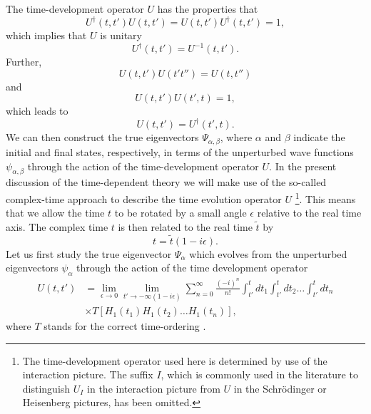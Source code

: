 The time-development operator $U$ has the
properties that
\begin{equation}
     U^{\dagger}(t,t')U(t,t')=U(t,t')U^{\dagger}(t,t')=1,
\end{equation}
which implies that $U$ is unitary
\begin{equation}
     U^{\dagger}(t,t')=U^{-1}(t,t').
\end{equation}
Further,
\begin{equation}
    U(t,t')U(t't'')=U(t,t'')
\end{equation}
and
\begin{equation}
    U(t,t')U(t',t)=1,
\end{equation}
which leads to
\begin{equation}
    U(t,t')=U^{\dagger}(t',t).
\end{equation}
We can then construct the true eigenvectors $\Psi_{\alpha ,\beta}$, 
where $\alpha$ and
$\beta$ indicate the initial and final states, respectively, in
terms of the unperturbed wave functions $\psi_{\alpha,\beta}$  
through the
action of the time-development operator $U$.
In the present discussion of the time-dependent theory we will make
use of the so-called complex-time approach to describe the time
evolution operator $U$ \cite{ko90}\footnote{The time-development 
operator used here is determined by use
of the interaction picture. The suffix $I$, which is commonly
used in the literature to distinguish $U_I$ in the interaction
picture from $U$ in the
Schr\"{o}dinger or Heisenberg pictures, has been omitted.}.
This means that we
allow the time $t$ to be rotated by a small angle $\epsilon$
relative to the real time axis. The complex time $t$ is then
related to the real time $\tilde{t}$ by
\begin{equation}
t=\tilde{t}(1-i\epsilon ).
\end{equation}
Let us first study the true eigenvector $\Psi_{\alpha}$ which evolves
from the unperturbed eigenvectors $\psi_{\alpha}$ through the action of the
time development operator
\begin{eqnarray}
   U(t,t')&=\lim_{\epsilon \rightarrow 0}
   \lim_{t'\rightarrow -\infty (1-i\epsilon )}
   {\displaystyle\sum_{n=0}^{\infty}\frac{(-i)^n}{n!}
   \int_{t'}^{t}dt_1  \int_{t'}^{t}dt_2\dots  \int_{t'}^{t}dt_n}
		\\ \nonumber
	     &  \times T\left[H_1(t_1)H_1(t_2)\dots H_1(t_n)\right],
	     \label{eq:timeu}
\end{eqnarray}
where $T$ stands for the correct time-ordering \cite{no88,fw71}.


